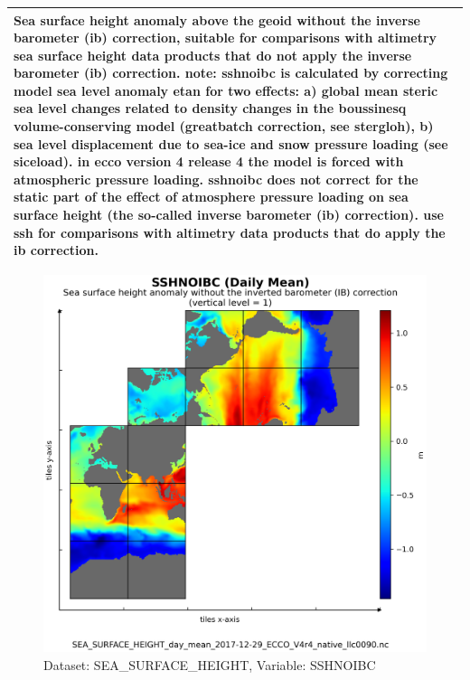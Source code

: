 \begin{longtable}{|m{}|m{}|m{}|m{}|}
\multicolumn{4}{|p{1\textwidth}|}{\footnotesize{{Sea surface height anomaly above the geoid without the inverse barometer (ib) correction, suitable for comparisons with altimetry sea surface height data products that do not apply the inverse barometer (ib) correction. note: sshnoibc is calculated by correcting model sea level anomaly etan for two effects: a) global mean steric sea level changes related to density changes in the boussinesq volume-conserving model (greatbatch correction, see stergloh), b) sea level displacement due to sea-ice and snow pressure loading (see siceload). in ecco version 4 release 4 the model is forced with atmospheric pressure loading. sshnoibc does not correct for the static part of the effect of atmosphere pressure loading on sea surface height (the so-called inverse barometer (ib) correction). use ssh for comparisons with altimetry data products that do apply the ib correction.}}} \\ \hline
\end{longtable}

\begin{figure}[H]
\centering
\includegraphics[scale=0.55]{../images/plots/v4r4/native_plots/Sea_Surface_Height/SSHNOIBC.png}
\caption{Dataset: SEA\_SURFACE\_HEIGHT, Variable: SSHNOIBC}
\label{tab:table-SEA_SURFACE_HEIGHT_SSHNOIBC-Plot}
\end{figure}
\newpage